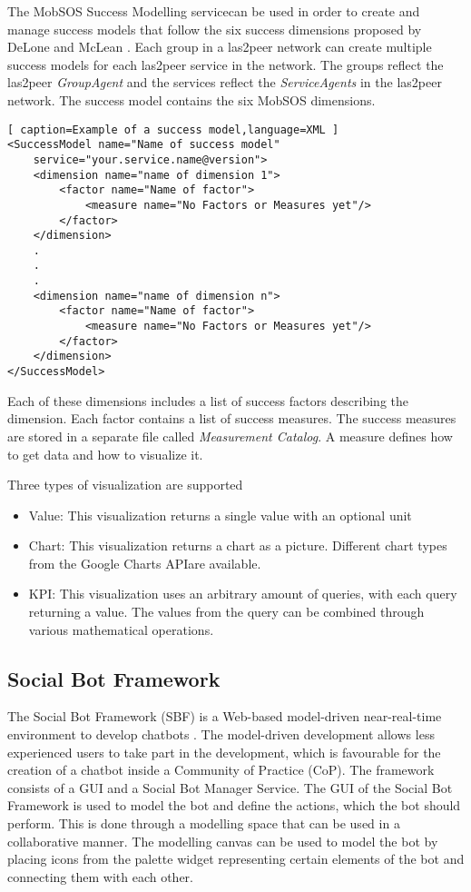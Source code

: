 The MobSOS Success Modelling service\footnotemark can be used in order to create and manage success models that follow the six success dimensions proposed by DeLone and McLean \cite{DeMc92}.
Each group in a las2peer network can create multiple success models for each las2peer service in the network. 
The groups reflect the las2peer \emph{GroupAgent} and the services reflect the \emph{ServiceAgents} in the las2peer network.
The success model contains the six MobSOS dimensions.
\begin{lstlisting}[ caption=Example of a success model,language=XML ]
<SuccessModel name="Name of success model" 
    service="your.service.name@version">
    <dimension name="name of dimension 1">
        <factor name="Name of factor">
            <measure name="No Factors or Measures yet"/>
        </factor>
    </dimension>
    .
    .
    .
    <dimension name="name of dimension n">
        <factor name="Name of factor">
            <measure name="No Factors or Measures yet"/>
        </factor>
    </dimension>
</SuccessModel>
\end{lstlisting}
Each of these dimensions includes a list of success factors describing the dimension.
Each factor contains a list of success measures. The success measures are stored in a separate file called \emph{Measurement Catalog}. A measure defines how to get data and how to visualize it. 

Three types of visualization are supported
\begin{itemize}
    \item Value: This visualization returns a single value with an optional unit
    \item Chart: This visualization returns a chart as a picture. Different chart types from the Google Charts API\footnotemark are available.
    \item KPI: This visualization uses an arbitrary amount of queries, with each query returning a value. The values from the query can be combined through various mathematical operations.
\end{itemize}


\subsection{Social Bot Framework}
The Social Bot Framework (SBF) is a Web-based model-driven near-real-time environment to develop chatbots \cite{NLKl19}. 
The model-driven development allows less experienced users to take part in the development, which is favourable for the creation of a chatbot inside a Community of Practice (CoP). 
The framework consists of a GUI and a Social Bot Manager Service.
The GUI of the Social Bot Framework is used to model the bot and define the actions, which the bot should perform. 
This is done through a modelling space that can be used in a collaborative manner. The modelling canvas can be used to model the bot by placing icons from the palette widget representing certain elements of the bot and connecting them with each other. 


